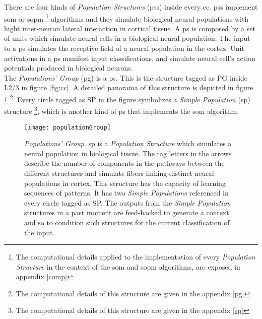 \documentclass[11pt,a4paper]{article}
\begin{document}
There are four kinds of \textit{Population Structures} (\ac{ps}s)
inside every \ac{cc}.
\ac{ps}s implement \ac{som} or \ac{sopm}
\footnote{The computational details applied to the implementation of every \textit{Population Structure}
in the context of the \ac{som} and \ac{sopm} algorithms, are exposed in appendix \ref{comp}}
algorithms and they simulate biological neural populations with hight inter-neuron
lateral interaction in cortical tissue.
A \ac{ps} is composed by a set of units which simulate neural cells in a biological neural population.
The input to a \ac{ps} simulates the receptive field of a neural population in the cortex.
Unit activations in a \ac{ps} manifest input classifications, and
simulate neural cell's action potentials produced in biological neurons.\\

The \textit{Populations' Group} (\ac{pg}) is a \ac{ps}.
This is the structure tagged as PG inside L2/3 in figure \ref{fig:cc}.
A detailed panorama of this structure is depicted in figure \ref{fig:pg}
\footnote{The computational details of this structure are given in the appendix \ref{pg}}.
Every circle tagged as SP in the figure symbolizes a \textit{Simple Population}
(\ac{sp}) structure
\footnote{The computational details of this structure are given in the appendix \ref{sp}},
which is another kind of \ac{ps} that implements the \ac{som} algorithm.\\

\begin{figure}[h]
\centering
\texttt{[image: populationGroup]}
\caption{\scriptsize{\textit{Populations' Group}.
\ac{sp} is a \textit{Population Structure} which simulates a neural population
in biological tissue.
The tag letters in the arrows describe the number of components in the pathways
between the different structures and simulate fibers linking distinct
neural populations in cortex.
This structure has the capacity of learning sequences of patterns.
It has two \textit{Simple Populations} referenced in every circle tagged as SP.
The outputs from the \textit{Simple Population} structures in a past moment
are feed-backed to generate a context and so to condition
such structures for the current classification of the input.}}
\label{fig:pg}
\end{figure}
\end{document}
